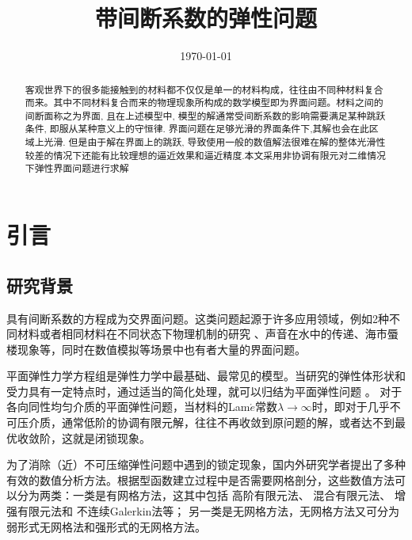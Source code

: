 \documentclass[a4paper,UTF8,titlepage]{ctexart}
\begin{document}
\title{带间断系数的弹性问题}
\date{\today}
\maketitle

\renewcommand{\abstractname}{\vspace{-2em}\large\bf 摘要}
\begin{abstract}
	客观世界下的很多能接触到的材料都不仅仅是单一的材料构成，往往由不同种材料复合而来。其中不同材料复合而来的物理现象所构成的数学模型即为界面问题。材料之间的间断面称之为界面, 且在上述模型中, 模型的解通常受间断系数的影响需要满足某种跳跃条件, 即服从某种意义上的守恒律. 界面问题在足够光滑的界面条件下,其解也会在此区域上光滑. 但是由于解在界面上的跳跃, 导致使用一般的数值解法很难在解的整体光滑性较差的情况下还能有比较理想的逼近效果和逼近精度.本文采用非协调有限元对二维情况下弹性界面问题进行求解  \\
\end{abstract}
\thispagestyle{empty}

\tableofcontents

\newpage

\section{引言}

\subsection{研究背景}

具有间断系数的方程成为交界面问题。这类问题起源于许多应用领域，例如2种不同材料或者相同材料在不同状态下物理机制的研究 \cite{邵文婷2017求解一类交界面问题的模态基函数谱元法数值实验}、声音在水中的传递、海市蜃楼现象等，同时在数值模拟等场景中也有者大量的界面问题。

平面弹性力学方程组是弹性力学中最基础、最常见的模型。当研究的弹性体形状和受力具有一定特点时，通过适当的简化处理，就可以归结为平面弹性问题 \cite{王兆清2018不可压缩平面问题的位移}。
对于各向同性均匀介质的平面弹性问题，当材料的Lam$\acute{e}$常数$\lambda \to \infty$时，即对于几乎不可压介质，通常低阶的协调有限元解，往往不再收敛到原问题的解，或者达不到最优收敛阶，这就是闭锁现象\cite{陈绍春2007平面弹性的一个新的}。

为了消除（近）不可压缩弹性问题中遇到的锁定现象，国内外研究学者提出了多种有效的数值分析方法。根据型函数建立过程中是否需要网格剖分，这些数值方法可以分为两类：一类是有网格方法，这其中包括
高阶有限元法\cite{peet2014legendre}、
混合有限元法\cite{masud2011variational}、
增强有限元法\cite{auricchio2005analysis}和
不连续Galerkin法\cite{hansbo2003discontinuous}等；
另一类是无网格方法，无网格方法又可分为弱形式无网格法和强形式的无网格方法\cite{王兆清2018不可压缩平面问题的位移}。
\end{document}
